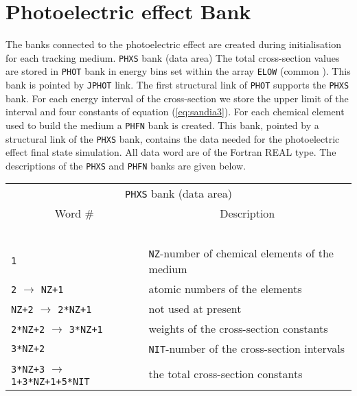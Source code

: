 \section{Photoelectric effect Bank}
 
The banks connected to the photoelectric effect are created during
initialisation for each tracking medium.
{\tt PHXS} bank (data area)
The total cross-section values are stored in {\tt PHOT} bank in energy bins
set within the array {\tt ELOW} (common ). This bank is pointed by
{\tt JPHOT} link. The first structural link of {\tt PHOT} supports the
{\tt PHXS} bank.
For each energy interval of the cross-section we store the upper limit of the
interval and four constants of equation (\ref{eq:sandia3}).
For each chemical element used to build the medium a {\tt PHFN} bank is created.
This bank, pointed by a structural link of the {\tt PHXS} bank, contains
the data needed for the photoelectric effect final state simulation.
All data word are of the Fortran REAL type.
The descriptions of the {\tt PHXS} and {\tt PHFN} banks are given below.
 
\begin{tabular}{ll}
\multicolumn{2}{c}{{\tt PHXS} bank (data area)} \\
\multicolumn{1}{c}{Word \#} & \multicolumn{1}{c}{Description} \\
\ & \ \\
{\tt 1} & 
\parbox{10cm}{{\tt NZ}-number of chemical elements of the medium} \\
{\tt 2} $\rightarrow$ {\tt NZ+1} & 
\parbox{10cm}{atomic numbers of the elements} \\
{\tt NZ+2} $\rightarrow$ {\tt 2*NZ+1} & 
\parbox{10cm}{not used at present} \\
{\tt 2*NZ+2} $\rightarrow$ {\tt 3*NZ+1} & 
\parbox{10cm}{weights of the cross-section constants} \\
{\tt 3*NZ+2} & 
\parbox{10cm}{{\tt NIT}-number of the cross-section intervals} \\
{\tt 3*NZ+3} $\rightarrow$ {\tt 1+3*NZ+1+5*NIT} & 
\parbox{10cm}{the total cross-section constants}
\end{tabular}
 
